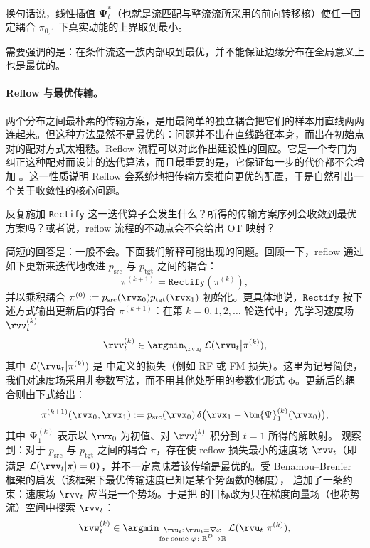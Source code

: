 换句话说，线性插值 $\bm{\Psi}^*_t$（也就是流匹配与整流流所采用的前向转移核）使任一固定耦合 $\pi_{0,1}$ 下真实动能的上界取到最小。

需要强调的是：在条件流这一族内部取到最优，并不能保证边缘分布在全局意义上也是最优的。


\paragraph{Reflow 与最优传输。}
两个分布之间最朴素的传输方案，是用最简单的独立耦合把它们的样本用直线两两连起来。但这种方法显然不是最优的：问题并不出在直线路径本身，而出在初始点对的配对方式太粗糙。Reflow 流程可以对此作出建设性的回应。它是一个专门为纠正这种配对而设计的迭代算法，而且最重要的是，它保证每一步的代价都不会增加 \citep{liu2022flow}。这一性质说明 Reflow 会系统地把传输方案推向更优的配置，于是自然引出一个关于收敛性的核心问题。
\begin{question}
    反复施加 \texttt{Rectify} 这一迭代算子会发生什么？所得的传输方案序列会收敛到最优方案吗？或者说，reflow 流程的不动点会不会给出 OT 映射？
\end{question}
简短的回答是：一般不会。下面我们解释可能出现的问题。回顾一下，reflow 通过如下更新来迭代地改进 $p_{\mathrm{src}}$ 与 $p_{\mathrm{tgt}}$ 之间的耦合：
\[
\pi^{(k+1)} = \texttt{Rectify}(\pi^{(k)}),
\]
并以乘积耦合 $\pi^{(0)} := p_{\mathrm{src}}(\rvx_0) p_{\mathrm{tgt}}(\rvx_1)$ 初始化。更具体地说，$\texttt{Rectify}$ 按下述方式输出更新后的耦合 $\pi^{(k+1)}$：在第 $k = 0, 1, 2, \ldots$ 轮迭代中，先学习速度场 $\rvv_t^{(k)}$
\[
\rvv_t^{(k)} \in \argmin_{\rvu_t} \, \mathcal{L}(\rvu_t\big\vert\pi^{(k)}),
\]
其中 $\mathcal{L}(\rvu_t\big\vert\pi^{(k)})$ 是  中定义的损失（例如 RF 或 FM 损失）。这里为记号简便，我们对速度场采用非参数写法，而不用其他处所用的参数化形式 $\bm{\phi}$。更新后的耦合则由下式给出：
\[
\pi^{(k+1)}(\rvx_0, \rvx_1) := p_{\mathrm{src}}(\rvx_0)\, \delta\big(\rvx_1 - \bm{\Psi}_1^{(k)}(\rvx_0)\big),
\]
其中 $\bm{\Psi}_1^{(k)}$ 表示以 $\rvx_0$ 为初值、对 $\rvv_t^{(k)}$ 积分到 $t=1$ 所得的解映射。\citet{liu2022flow} 观察到：对于 $p_{\mathrm{src}}$ 与 $p_{\mathrm{tgt}}$ 之间的耦合 $\pi$，存在使 reflow 损失最小的速度场 $\rvv_t$（即满足 $\mathcal{L}(\rvv_t |\pi) = 0$），并不一定意味着该传输是最优的。受 Benamou--Brenier 框架的启发（该框架下最优传输速度已知是某个势函数的梯度），\citet{liu2022rectified} 追加了一条约束：速度场 $\rvv_t$ 应当是一个势场。于是把  的目标改为只在梯度向量场（也称势流）空间中搜索 $\rvv_t$：
\begin{align}\label{eq:reflow-loss-gradient}
    \rvw_t^{(k)} \in \argmin_{\substack{\rvu_t:\, \rvu_t=\nabla\varphi \\ \text{for some }\varphi\colon\mathbb{R}^D\to\mathbb{R}}} \, \mathcal{L}(\rvu_t\big\vert\pi^{(k)}),
\end{align}
